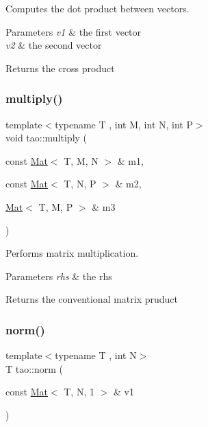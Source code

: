 Computes the dot product between vectors. 


\begin{DoxyParams}{Parameters}
{\em v1} & the first vector \\
\hline
{\em v2} & the second vector \\
\hline
\end{DoxyParams}
\begin{DoxyReturn}{Returns}
the cross product 
\end{DoxyReturn}
\mbox{\label{namespacetao_ab38f346af660c21af2f77045cd9d1dad}} 
\subsubsection{\texorpdfstring{multiply()}{multiply()}}
{\footnotesize\ttfamily template$<$typename T , int M, int N, int P$>$ \\
void tao\+::multiply (\begin{DoxyParamCaption}\item[{const \mbox{\hyperlink{classtao_1_1_mat}{Mat}}$<$ T, M, N $>$ \&}]{m1,  }\item[{const \mbox{\hyperlink{classtao_1_1_mat}{Mat}}$<$ T, N, P $>$ \&}]{m2,  }\item[{\mbox{\hyperlink{classtao_1_1_mat}{Mat}}$<$ T, M, P $>$ \&}]{m3 }\end{DoxyParamCaption})}



Performs matrix multiplication. 


\begin{DoxyParams}{Parameters}
{\em rhs} & the rhs \\
\hline
\end{DoxyParams}
\begin{DoxyReturn}{Returns}
the conventional matrix pruduct 
\end{DoxyReturn}
\mbox{\label{namespacetao_ac35e732bcf5d8bfb7df27de9fc96ba08}} 
\subsubsection{\texorpdfstring{norm()}{norm()}}
{\footnotesize\ttfamily template$<$typename T , int N$>$ \\
T tao\+::norm (\begin{DoxyParamCaption}\item[{const \mbox{\hyperlink{classtao_1_1_mat}{Mat}}$<$ T, N, 1 $>$ \&}]{v1 }\end{DoxyParamCaption})}



